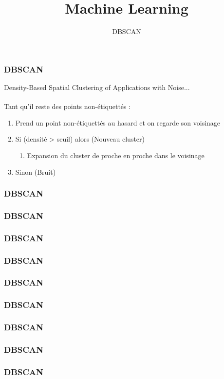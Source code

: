 \documentclass{formation}
\title{Machine Learning}
\subtitle{DBSCAN}
\begin{document}
\maketitle

\begin{frame}
  \frametitle{DBSCAN}
  Density-Based Spatial Clustering of Applications with Noise...\\
  \\
  Tant qu'il reste des points non-étiquettés : \\
  \begin{enumerate}
  \item Prend un point non-étiquettés au hasard et on regarde son voisinage
  \item Si (densité > seuil) alors (Nouveau cluster)
    \begin{enumerate}
    \item Expansion du cluster de proche en proche dans le voisinage
    \end{enumerate}
  \item Sinon (Bruit)
  \end{enumerate}
\end{frame}

\begin{frame}
  \frametitle{DBSCAN}
\end{frame}

\begin{frame}
  \frametitle{DBSCAN}
\end{frame}

\begin{frame}
  \frametitle{DBSCAN}
\end{frame}

\begin{frame}
  \frametitle{DBSCAN}
\end{frame}

\begin{frame}
  \frametitle{DBSCAN}
\end{frame}

\begin{frame}
  \frametitle{DBSCAN}
\end{frame}

\begin{frame}
  \frametitle{DBSCAN}
\end{frame}

\begin{frame}
  \frametitle{DBSCAN}
\end{frame}

\begin{frame}
  \frametitle{DBSCAN}
\end{frame}
\end{document}
